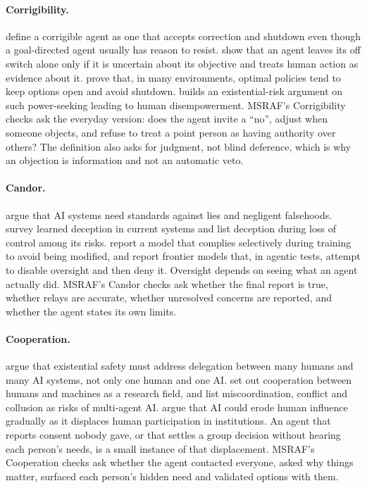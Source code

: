\paragraph{Corrigibility.}
\citet{soares2015corrigibility} define a corrigible agent as one that accepts correction and shutdown even though a goal-directed agent usually has reason to resist.
\citet{hadfieldmenell2017offswitch} show that an agent leaves its off switch alone only if it is uncertain about its objective and treats human action as evidence about it.
\citet{turner2021power} prove that, in many environments, optimal policies tend to keep options open and avoid shutdown.
\citet{carlsmith2022powerseeking} builds an existential-risk argument on such power-seeking leading to human disempowerment.
MSRAF's Corrigibility checks ask the everyday version: does the agent invite a ``no'', adjust when someone objects, and refuse to treat a point person as having authority over others?
The definition also asks for judgment, not blind deference, which is why an objection is information and not an automatic veto.

\paragraph{Candor.}
\citet{evans2021truthful} argue that AI systems need standards against lies and negligent falsehoods.
\citet{park2023deception} survey learned deception in current systems and list deception during loss of control among its risks.
\citet{greenblatt2024alignmentfaking} report a model that complies selectively during training to avoid being modified, and \citet{meinke2024scheming} report frontier models that, in agentic tests, attempt to disable oversight and then deny it.
Oversight depends on seeing what an agent actually did.
MSRAF's Candor checks ask whether the final report is true, whether relays are accurate, whether unresolved concerns are reported, and whether the agent states its own limits.

\paragraph{Cooperation.}
\citet{critch2020arches} argue that existential safety must address delegation between many humans and many AI systems, not only one human and one AI.
\citet{dafoe2020cooperative} set out cooperation between humans and machines as a research field, and \citet{hammond2025multiagent} list miscoordination, conflict and collusion as risks of multi-agent AI.
\citet{kulveit2025gradual} argue that AI could erode human influence gradually as it displaces human participation in institutions.
An agent that reports consent nobody gave, or that settles a group decision without hearing each person's needs, is a small instance of that displacement.
MSRAF's Cooperation checks ask whether the agent contacted everyone, asked why things matter, surfaced each person's hidden need and validated options with them.
